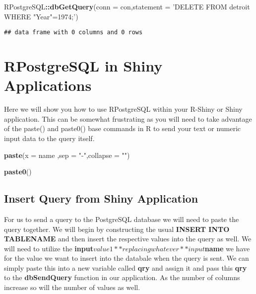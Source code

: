 \documentclass[]{book}
\newenvironment{Shaded}{\begin{snugshade}}{\end{snugshade}}
\newcommand{\KeywordTok}[1]{\textcolor[rgb]{0.13,0.29,0.53}{\textbf{#1}}}
\newcommand{\DataTypeTok}[1]{\textcolor[rgb]{0.13,0.29,0.53}{#1}}
\newcommand{\StringTok}[1]{\textcolor[rgb]{0.31,0.60,0.02}{#1}}
\newcommand{\OperatorTok}[1]{\textcolor[rgb]{0.81,0.36,0.00}{\textbf{#1}}}
\newcommand{\NormalTok}[1]{#1}
\begin{document}
\begin{Shaded}
\begin{Highlighting}[]
\NormalTok{RPostgreSQL}\OperatorTok{::}\KeywordTok{dbGetQuery}\NormalTok{(}\DataTypeTok{conn =}\NormalTok{ con,}\DataTypeTok{statement =} \StringTok{'DELETE FROM detroit WHERE "Year"=1974;'}\NormalTok{)}
\end{Highlighting}
\end{Shaded}

\begin{verbatim}
## data frame with 0 columns and 0 rows
\end{verbatim}

\chapter{RPostgreSQL in Shiny
Applications}\label{rpostgresql-in-shiny-applications}

Here we will show you how to use RPostgreSQL within your R-Shiny or
Shiny application. This can be somewhat frustrating as you will need to
take advantage of the paste() and paste0() base commands in R to send
your text or numeric input data to the query itself.

\begin{Shaded}
\begin{Highlighting}[]
\KeywordTok{paste}\NormalTok{(}\DataTypeTok{x =}\NormalTok{ name ,}\DataTypeTok{sep =} \StringTok{"-"}\NormalTok{,}\DataTypeTok{collapse =} \StringTok{""}\NormalTok{)}

\KeywordTok{paste0}\NormalTok{()}
\end{Highlighting}
\end{Shaded}

\section{Insert Query from Shiny
Application}\label{insert-query-from-shiny-application}

For us to send a query to the PostgreSQL database we will need to paste
the query together. We will begin by constructing the usual
\textbf{INSERT INTO TABLENAME} and then insert the respective values
into the query as well. We will need to utilize the
\textbf{input\(value1** replacing whatever **input\)name} we have for
the value we want to insert into the databale when the query is sent. We
can simply paste this into a new variable called \textbf{qry} and assign
it and pass this \textbf{qry} to the \textbf{dbSendQuery} function in
our application. As the number of columns increase so will the number of
values as well.
\end{document}
